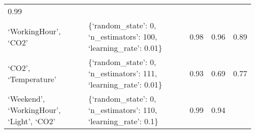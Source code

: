 \documentclass[11pt]{article}
\begin{document}
\begin{longtable}[]{@{}lllll@{}}
\begin{minipage}[t]{0.05\columnwidth}
0.99\strut
\end{minipage}\tabularnewline
\begin{minipage}[t]{0.28\columnwidth}\raggedright
`WorkingHour', `CO2'\strut
\end{minipage} & \begin{minipage}[t]{0.43\columnwidth}\raggedright
\{`random\_state': 0, `n\_estimators': 100, `learning\_rate':
0.01\}\strut
\end{minipage} & \begin{minipage}[t]{0.05\columnwidth}\raggedright
0.98\strut
\end{minipage} & \begin{minipage}[t]{0.05\columnwidth}\raggedright
0.96\strut
\end{minipage} & \begin{minipage}[t]{0.05\columnwidth}\raggedright
0.89\strut
\end{minipage}\tabularnewline
\begin{minipage}[t]{0.28\columnwidth}\raggedright
`CO2', `Temperature'\strut
\end{minipage} & \begin{minipage}[t]{0.43\columnwidth}\raggedright
\{`random\_state': 0, `n\_estimators': 111, `learning\_rate':
0.01\}\strut
\end{minipage} & \begin{minipage}[t]{0.05\columnwidth}\raggedright
0.93\strut
\end{minipage} & \begin{minipage}[t]{0.05\columnwidth}\raggedright
0.69\strut
\end{minipage} & \begin{minipage}[t]{0.05\columnwidth}\raggedright
0.77\strut
\end{minipage}\tabularnewline
\begin{minipage}[t]{0.28\columnwidth}\raggedright
`Weekend', `WorkingHour', `Light', `CO2'\strut
\end{minipage} & \begin{minipage}[t]{0.43\columnwidth}\raggedright
\{`random\_state': 0, `n\_estimators': 110, `learning\_rate':
0.1\}\strut
\end{minipage} & \begin{minipage}[t]{0.05\columnwidth}\raggedright
0.99\strut
\end{minipage} & \begin{minipage}[t]{0.05\columnwidth}\raggedright
0.94\strut
\end{minipage} & \begin{minipage}[t]{0.05\columnwidth}\raggedright

\end{minipage}
\end{longtable}
\end{document}
